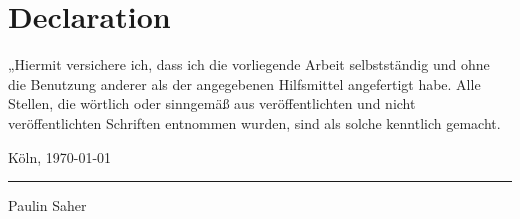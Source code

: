 \newpage
\thispagestyle{empty}
\section*{Declaration}

„Hiermit versichere ich, dass ich die vorliegende Arbeit selbstständig und ohne die Benutzung anderer als der angegebenen Hilfsmittel angefertigt habe. Alle Stellen, die wörtlich oder sinngemäß aus veröffentlichten und nicht veröffentlichten Schriften entnommen wurden, sind als solche kenntlich gemacht.

\vspace{0.6cm}

Köln, \today

\vspace{1cm}

\rule{6cm}{0.4pt}

Paulin Saher
